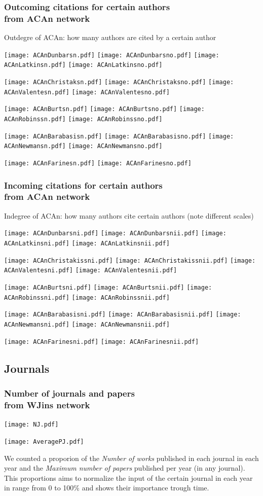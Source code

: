 \documentclass[hyperref={pdfstartview={FitBH -32768},
                         pdfpagemode=FullScreen,
                         plainpages=false,
                         colorlinks=true}
              ]{beamer}
\begin{document}
\begin{frame}[fragile]
\frametitle{Outcoming citations for certain authors \\ \normalsize from ACAn network} 
Outdegre of ACAn: how many authors are cited by a certain author \medskip 

\centerline{
\texttt{[image: ACAnDunbarsn.pdf]} 
\texttt{[image: ACAnDunbarsno.pdf]} 
\texttt{[image: ACAnLatkinsn.pdf]} 
\texttt{[image: ACAnLatkinsno.pdf]}}
\centerline{
\texttt{[image: ACAnChristaksn.pdf]} 
\texttt{[image: ACAnChristaksno.pdf]}
\texttt{[image: ACAnValentesn.pdf]} 
\texttt{[image: ACAnValentesno.pdf]}} 
\centerline{
\texttt{[image: ACAnBurtsn.pdf]}
\texttt{[image: ACAnBurtsno.pdf]}
\texttt{[image: ACAnRobinssn.pdf]} 
\texttt{[image: ACAnRobinssno.pdf]}} 
\centerline{
\texttt{[image: ACAnBarabasisn.pdf]} 
\texttt{[image: ACAnBarabasisno.pdf]}
\texttt{[image: ACAnNewmansn.pdf]} 
\texttt{[image: ACAnNewmansno.pdf]}} 
\centerline{
\texttt{[image: ACAnFarinesn.pdf]} 
\texttt{[image: ACAnFarinesno.pdf]}} 
\end{frame}   

\begin{frame}[fragile]
\frametitle{Incoming citations for certain authors \\ \normalsize from ACAn network} 
Indegree of ACAn: how many authors cite  certain authors (note different scales) \medskip 

\centerline{
\texttt{[image: ACAnDunbarsni.pdf]} 
\texttt{[image: ACAnDunbarsnii.pdf]}
\texttt{[image: ACAnLatkinsni.pdf]} 
\texttt{[image: ACAnLatkinsnii.pdf]}}
\centerline{
\texttt{[image: ACAnChristakissni.pdf]} 
\texttt{[image: ACAnChristakissnii.pdf]}
\texttt{[image: ACAnValentesni.pdf]} 
\texttt{[image: ACAnValentesnii.pdf]}} 
\centerline{
\texttt{[image: ACAnBurtsni.pdf]} 
\texttt{[image: ACAnBurtsnii.pdf]}
\texttt{[image: ACAnRobinssni.pdf]} 
\texttt{[image: ACAnRobinssnii.pdf]}} 
\centerline{
\texttt{[image: ACAnBarabasisni.pdf]} 
\texttt{[image: ACAnBarabasisnii.pdf]}
\texttt{[image: ACAnNewmansni.pdf]} 
\texttt{[image: ACAnNewmansnii.pdf]}} 
\centerline{
\texttt{[image: ACAnFarinesni.pdf]}
\texttt{[image: ACAnFarinesnii.pdf]}} 
\end{frame}    

\subsection{Journals}
\begin{frame}[fragile]
\frametitle{Number of journals and papers \\ \normalsize from WJins network }
\centerline{
\texttt{[image: NJ.pdf]}} 
\centerline{
\texttt{[image: AveragePJ.pdf]}}

\footnotesize
We counted a proporion of the \textit{Number of works} published in each journal in each year and the \textit{Maximum number of papers} published per year (in any journal). This proportions aims to normalize the input of the certain journal in each year in range from 0 to 100\% and shows their importance trough time. 
\end{frame}     
\end{document}
